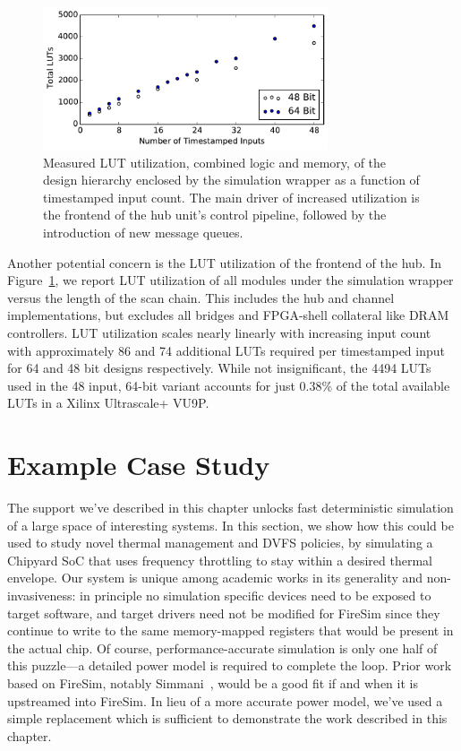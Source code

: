 \begin{figure}
    \centering
    \includegraphics[width=0.75\textwidth]{figures/pdes-hub-lut-scaling.pdf}
    \caption{Measured LUT utilization, combined logic and memory, of the design hierarchy enclosed by the
    simulation wrapper as a function of timestamped input count. The main
    driver of increased utilization is the frontend of the hub unit's control
    pipeline, followed by the introduction of new message queues.}
    \label{fig:pdes-hub-lut-scaling}
\end{figure}

Another potential concern is the LUT utilization of the frontend of the hub.
In Figure~\ref{fig:pdes-hub-lut-scaling}, we report LUT utilization of all
modules under the simulation wrapper versus the length of the scan chain. This
includes the hub and channel implementations, but excludes all bridges and
FPGA-shell collateral like DRAM controllers. LUT utilization scales nearly linearly
with increasing input count with approximately 86 and 74 additional LUTs required per
timestamped input for 64 and 48 bit designs respectively. While not
insignificant, the 4494 LUTs used in the 48 input, 64-bit variant accounts for
just 0.38\% of the total available LUTs in a Xilinx Ultrascale+ VU9P.

\section{Example Case Study}

The support we've described in this chapter unlocks fast deterministic
simulation of a large space of interesting systems. In this section, we show how this
could be used to study novel thermal management and DVFS policies, by
simulating a Chipyard SoC that uses frequency throttling to stay within a
desired thermal envelope. Our system is unique among academic works in its
generality and non-invasiveness: in principle no simulation specific devices need
to be exposed to target software, and target drivers need not be modified for
FireSim since they continue to write to the same memory-mapped registers that
would be present in the actual chip. Of course, performance-accurate simulation is only
one half of this puzzle---a detailed power model is required to complete
the loop. Prior work based on FireSim, notably Simmani~\cite{Simmani}, would be
a good fit if and when it is upstreamed into FireSim.  In lieu of a more
accurate power model, we've used a simple replacement which is sufficient to
demonstrate the work described in this chapter.

